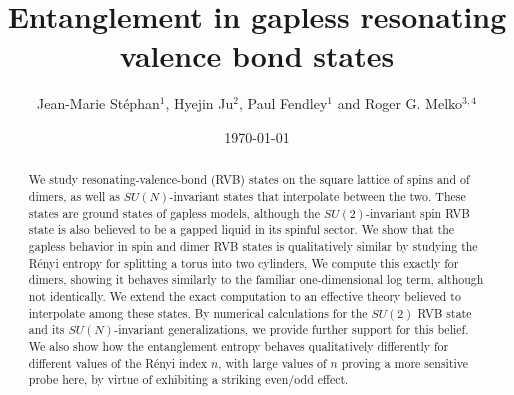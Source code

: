 \documentclass[11pt]{iopart}
\begin{document}
 
\title[Entanglement in RVB and quantum dimer states]{Entanglement in gapless resonating valence bond states}
 
\author{Jean-Marie St\'ephan$^1$, Hyejin Ju$^2$, Paul Fendley$^1$ and Roger G. Melko$^{3,4}$}

\address{$^1$ Physics Department, University of Virginia, Charlottesville, VA 22904-4714}

\address{$^2$ Department of Physics, University of California, Santa Barbara, CA, 93106-9530}

\address{$^3$ Department of Physics and Astronomy, University of Waterloo, Ontario, N2L 3G1, Canada}

\address{$^4$ Perimeter Institute for Theoretical Physics, Waterloo, Ontario N2L 2Y5, Canada}



\date{\today}
\begin{abstract}

We study resonating-valence-bond (RVB) states on the square lattice of spins and of dimers,  as well as $SU(N)$-invariant states that interpolate between the two. These states are ground states of gapless models, although the $SU(2)$-invariant spin RVB state is also believed to be a gapped liquid in its spinful sector. We show that the gapless behavior in spin and dimer RVB states is qualitatively similar by studying the R\'enyi entropy for splitting a torus into two cylinders,  We compute this exactly for dimers, showing it behaves similarly to the familiar one-dimensional log term, although not identically. We extend the exact computation to an effective theory believed to interpolate among these states. By numerical calculations for the $SU(2)$ RVB state and its $SU(N)$-invariant generalizations, we provide further support for this belief. We also show how the entanglement entropy behaves qualitatively differently for different values of the 
R\'enyi index $n$, with large values of $n$ proving a more sensitive probe here, by virtue of exhibiting a striking even/odd effect.


\end{abstract}
\maketitle

\tableofcontents
\vfill\eject
\end{document}
